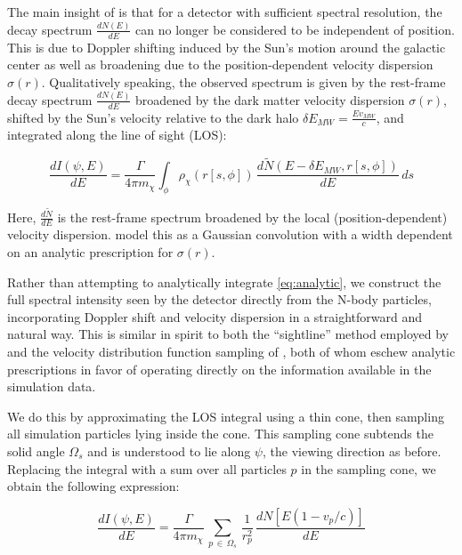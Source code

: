 \documentclass[aps,prl,10pt,twocolumn,superscriptaddress,showpacs]{revtex4-1}
\begin{document}
The main insight of \cite{speckhard2016} is that for a detector with sufficient spectral
resolution, the decay spectrum $\frac{dN(E)}{dE}$ can no longer be considered to be independent of
position.  This is due to Doppler shifting induced by the Sun's motion around the galactic center
as well as broadening due to the position-dependent velocity dispersion $\sigma(r)$.
Qualitatively speaking, the observed spectrum is given by the rest-frame decay spectrum
$\frac{dN(E)}{dE}$ broadened by the dark matter velocity dispersion $\sigma(r)$, shifted by the Sun's velocity 
relative to the dark halo $\delta E_{MW} = \frac{E v_{MW}}{c}$, and integrated along the line of sight (LOS):

\begin{equation} \label{eq:analytic}
\frac{dI(\psi, E)}{dE} = \frac{\Gamma}{4 \pi m_\chi} \int_\phi \rho_\chi(r[s,\phi]) \,
\frac{d\widetilde{N}(E-\delta E_{MW}, r[s,\phi])}{dE} \, ds
\end{equation}

Here, $\frac{d\widetilde{N}}{dE}$ is the rest-frame spectrum broadened by the local
(position-dependent) velocity dispersion. \cite{speckhard2016} model this as a Gaussian convolution
with a width dependent on an analytic prescription for $\sigma(r)$.

Rather than attempting to analytically integrate \eqref{eq:analytic}, we construct the full
spectral intensity seen by the detector directly from the N-body particles, incorporating Doppler shift
and velocity dispersion in a straightforward and natural way.   This is similar in spirit to both the ``sightline'' method employed by 
\cite{lovell2015} and the velocity distribution function sampling of \cite{mao2013}, both of whom
eschew analytic prescriptions in favor of operating directly on the information available in the
simulation data. 

We do this by approximating the LOS integral using a thin cone, then sampling all simulation
particles lying inside the cone.  This sampling cone subtends the solid angle $\Omega_s$ and is
understood to lie along $\psi$, the viewing direction as before.  Replacing the integral with a sum over all particles
$p$ in the sampling cone, we obtain the following expression:

\begin{equation} \label{eq:discrete}
	\frac{dI(\psi, E)}{dE} = \frac{\Gamma}{4 \pi m_\chi}\, \sum_{p \, \in \, \Omega_s}
	\, \frac{1}{r_p^{2}} \, \frac{dN[E(1-v_p/c)]}{dE}
\end{equation}
\end{document}
